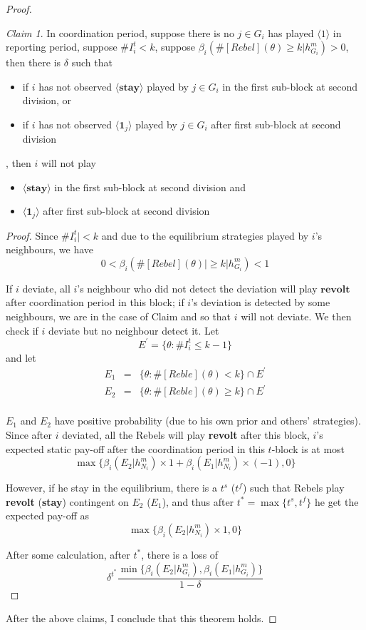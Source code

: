 \documentclass[12pt,letter]{article}
\theoremstyle{definition}
\theoremstyle{remark}
\theoremstyle{claim}
\newtheorem{claim}{Claim}
\begin{document}
\begin{proof}
\begin{claim} 
\label{claim_report_with_no_message_coordination_period}
In coordination period, suppose there is no $j\in G_i$ has played $\langle 1 \rangle$ in reporting period, suppose $\# I^t_i<k$, suppose $\beta_{i}(\#[Rebel](\theta)\geq k|h^{m}_{G_i})>0$, then there is $\delta$ such that 
\begin{itemize}
\item if $i$ has not observed $\langle \textbf{stay} \rangle$ played by $j\in G_i$ in the first sub-block at second division, or
\item if $i$ has not observed $\langle \mathbf{1}_j \rangle$ played by $j\in G_i$ after first sub-block at second division
\end{itemize}
, then $i$ will not play
\begin{itemize}
\item $\langle \textbf{stay} \rangle$  in the first sub-block at second division and
\item $\langle \mathbf{1}_j \rangle$  after first sub-block at second division
\end{itemize}
\end{claim}

\begin{proof}
Since $\# I^t_i|<k$ and due to the equilibrium strategies played by $i$'s neighbours, we have 
\[0<\beta_{i}(\#[Rebel](\theta)|\geq k|h^{m}_{G_i})<1\]

If $i$ deviate, all $i$'s neighbour who did not detect the deviation will play $\textbf{revolt}$ after coordination period in this block; if $i$'s deviation is detected by some neighbours, we are in the case of Claim and so that $i$ will not deviate. We then check if $i$ deviate but no neighbour detect it.
Let 
\[E^{'}=\{\theta:\#I^{t}_i\leq k-1\}\]
and let 
\begin{eqnarray*}
E_1&=&\{\theta: \#[Reble](\theta)<k\}\cap E^{'}\\
E_2&=&\{\theta: \#[Reble](\theta)\geq k\}\cap E^{'}\\
\end{eqnarray*}

$E_1$ and $E_2$ have positive probability (due to his own prior and others' strategies). Since after $i$ deviated, all the Rebels will play \textbf{revolt} after this block, $i$'s expected static pay-off after the coordination period in this $t$-block is at most 
\[
{\max\{\beta_{i}(E_2|h^{m}_{N_i})\times 1+\beta_{i}(E_1|h^{m}_{N_i})\times (-1), 0\}}
\]

However, if he stay in the equilibrium, there is a $t^s$ ($t^f$) such that Rebels play \textbf{revolt} (\textbf{stay}) contingent on $E_2$ ($E_1$), and thus after $t^*=\max\{t^s,t^f\}$ he get the expected pay-off as
\[
{\max\{\beta_{i}(E_2|h^{m}_{N_i})\times 1, 0\}}
\]

After some calculation, after $t^*$, there is a loss of
\[\delta^{t^{*}}\frac{\min\{\beta_{i}(E_2|h^{m}_{G_i}),\beta_{i}(E_1|h^{m}_{G_i})\}}{1-\delta}\]

\end{proof}

After the above claims, I conclude that this theorem holds.


\end{proof}
\end{document}
